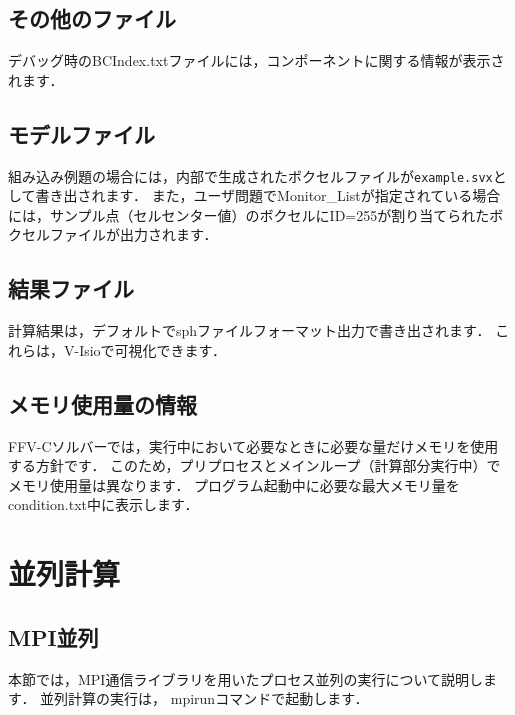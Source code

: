 %
\pagebreak
\subsection{その他のファイル}
デバッグ時のBCIndex.txtファイルには，コンポーネントに関する情報が表示されます．

%
\pagebreak
\subsection{モデルファイル}
組み込み例題の場合には，内部で生成されたボクセルファイルが\verb|example.svx|として書き出されます．
また，ユーザ問題でMonitor\_Listが指定されている場合には，サンプル点（セルセンター値）のボクセルにID=255が割り当てられたボクセルファイルが出力されます．

%
\pagebreak
\subsection{結果ファイル}

計算結果は，デフォルトでsphファイルフォーマット出力で書き出されます．
これらは，V-Isioで可視化できます．


%
\pagebreak
\subsection{メモリ使用量の情報}

FFV-Cソルバーでは，実行中において必要なときに必要な量だけメモリを使用する方針です．
このため，プリプロセスとメインループ（計算部分実行中）でメモリ使用量は異なります．
プログラム起動中に必要な最大メモリ量をcondition.txt中に表示します．




\pagebreak
\section{並列計算}
\label{sec:parallel_exec}

\subsection{MPI並列}
\label{sec:MPI}
本節では，MPI通信ライブラリを用いたプロセス並列の実行について説明します．
並列計算の実行は，
mpirunコマンドで起動します．

{\small
{}
}

